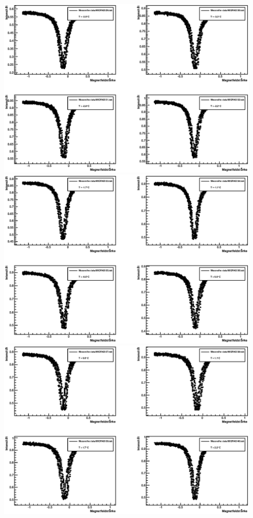 \documentclass[12pt]{article}
\begin{document}
\includegraphics[width=1\linewidth]{pictures/4.eps} \\
\includegraphics[width=1\linewidth]{pictures/5.eps} \\
\includegraphics[width=1\linewidth]{pictures/6.eps} \\
\end{document}
